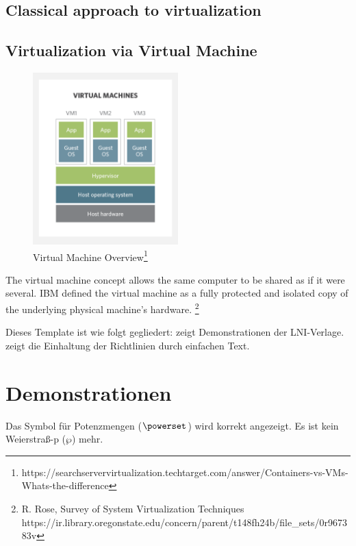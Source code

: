 \documentclass[utf8,biblatex]{lni}
\begin{document}
\subsection{Classical approach to virtualization}

\subsection{Virtualization via Virtual Machine}

\begin{figure}
  \centering
  \includegraphics[width=0.5\textwidth]{VM.pdf}
  \caption{Virtual Machine Overview\footnote{https://searchservervirtualization.techtarget.com/answer/Containers-vs-VMs-Whats-the-difference}}
  \label{img:vm}
\end{figure}

\glqq The virtual machine concept allows the same computer to be shared as
if it were several. IBM defined the virtual machine as a fully protected
and isolated copy of the underlying physical machine’s hardware. \glqq\footnote{R. Rose, \glqq Survey of System Virtualization Techniques \glqq https://ir.library.oregonstate.edu/concern/parent/t148fh24b/file_sets/0r967383v}


Dieses Template ist wie folgt gegliedert:
 zeigt Demonstrationen der LNI-Verlage.
 zeigt die Einhaltung der Richtlinien durch einfachen Text.

\section{Demonstrationen}
\label{sec:demos}
Das Symbol für Potenzmengen ($\powerset$) wird korrekt angezeigt.
Es ist kein Weierstraß-p ($\wp$) mehr.
\end{document}
